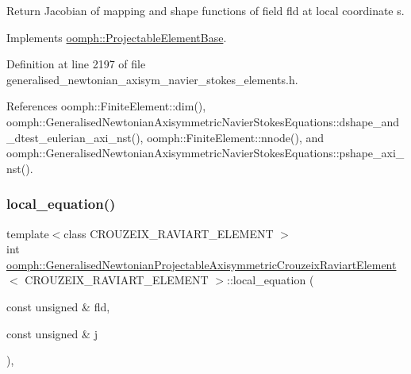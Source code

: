 Return Jacobian of mapping and shape functions of field fld at local coordinate s. 



Implements \hyperlink{classoomph_1_1ProjectableElementBase_ad45c21b58c0985d52f68ab2d79cbb488}{oomph\+::\+Projectable\+Element\+Base}.



Definition at line 2197 of file generalised\+\_\+newtonian\+\_\+axisym\+\_\+navier\+\_\+stokes\+\_\+elements.\+h.



References oomph\+::\+Finite\+Element\+::dim(), oomph\+::\+Generalised\+Newtonian\+Axisymmetric\+Navier\+Stokes\+Equations\+::dshape\+\_\+and\+\_\+dtest\+\_\+eulerian\+\_\+axi\+\_\+nst(), oomph\+::\+Finite\+Element\+::nnode(), and oomph\+::\+Generalised\+Newtonian\+Axisymmetric\+Navier\+Stokes\+Equations\+::pshape\+\_\+axi\+\_\+nst().

\mbox{\label{classoomph_1_1GeneralisedNewtonianProjectableAxisymmetricCrouzeixRaviartElement_ab19ecd24a11c5fb2d805b138e5fff043}} 
\subsubsection{\texorpdfstring{local\+\_\+equation()}{local\_equation()}}
{\footnotesize\ttfamily template$<$class C\+R\+O\+U\+Z\+E\+I\+X\+\_\+\+R\+A\+V\+I\+A\+R\+T\+\_\+\+E\+L\+E\+M\+E\+NT $>$ \\
int \hyperlink{classoomph_1_1GeneralisedNewtonianProjectableAxisymmetricCrouzeixRaviartElement}{oomph\+::\+Generalised\+Newtonian\+Projectable\+Axisymmetric\+Crouzeix\+Raviart\+Element}$<$ C\+R\+O\+U\+Z\+E\+I\+X\+\_\+\+R\+A\+V\+I\+A\+R\+T\+\_\+\+E\+L\+E\+M\+E\+NT $>$\+::local\+\_\+equation (\begin{DoxyParamCaption}\item[{const unsigned \&}]{fld,  }\item[{const unsigned \&}]{j }\end{DoxyParamCaption})\hspace{0.3cm}{\ttfamily [inline]}, {\ttfamily [virtual]}}



